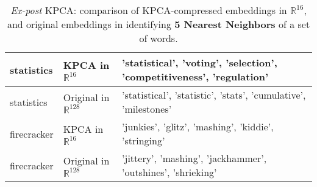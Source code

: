 \begin{table}[h]
\begin{tabular}{|l|l|l|}
statistics & KPCA in $\mathbb{R}^{16}$ & 'statistical', 'voting', 'selection', 'competitiveness', 'regulation'\\ \hline
statistics & Original in $\mathbb{R}^{128}$ & 'statistical', 'statistic', 'stats', 'cumulative', 'milestones'\\ \hline
firecracker & KPCA in $\mathbb{R}^{16}$ & 'junkies', 'glitz', 'mashing', 'kiddie', 'stringing' \\ \hline
firecracker & Original in $\mathbb{R}^{128}$ & 'jittery', 'mashing', 'jackhammer', 'outshines', 'shrieking'\\ \hline
\end{tabular}
\caption{\textit{Ex-post} KPCA: comparison of KPCA-compressed embeddings in $\mathbb{R}^{16}$, and original embeddings in identifying \textbf{5 Nearest Neighbors} of a set of words.}
\label{table:5nn-1k-post}
\end{table}


